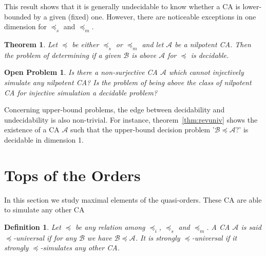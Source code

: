 \documentclass[a4paper]{elsarticle}
\def\qed{\relax\ifmmode\hskip2em \blacksquare\else\unskip\nobreak\hfill\hskip1em $\blacksquare$\fi}
\newcommand{\ACA}{\mathcal{A}}
\newcommand{\ACB}{\mathcal{B}}
\newcommand{\ACC}{\mathcal{C}}
\newcommand\alphabe[1]{S_{#1}}
\newcommand{\alphA}{\alphabe{\ACA}}
\newcommand{\alphB}{\alphabe{\ACB}}
\newcommand{\alphC}{\alphabe{\ACC}}
\newcommand{\fac}{\trianglelefteq}
\newcommand\bulk[2]{{#1}^{\left\langle{#2}\right\rangle}}
\newcommand{\simu}{\preccurlyeq}
\newcommand{\sacsimu}{\simu_i}
\newcommand{\facsimu}{\simu_s}
\newcommand{\facsacsimu}{\simu_m}
\newtheorem{defn}{Definition}[section]
\newtheorem{thm}{Theorem}[section]
\newtheorem{openpb}{Open Problem}
\begin{document}
This result shows that it is generally undecidable to know whether a
CA is lower-bounded by a given (fixed) one. However, there are
noticeable exceptions in one dimension for $\facsimu$ and $\facsacsimu$.

\begin{thm}
  \label{thm:abovenilpo}
  Let $\simu$ be either $\facsimu$ or $\facsacsimu$ and let $\ACA$ be
  a nilpotent CA. Then the problem of determining if a given $\ACB$ is
  above $\ACA$ for $\simu$ is decidable.
\end{thm}

\begin{openpb}
  \label{open:abovenilpo}
  Is there a non-surjective CA $\ACA$ which cannot injectively
  simulate any nilpotent CA? Is the problem of being above the class
  of nilpotent CA for injective simulation a decidable problem?
\end{openpb}


Concerning upper-bound problems, the edge between decidability and
undecidability is also non-trivial.  For instance,
theorem~\ref{thm:revuniv} shows the existence of a CA $\ACA$ such that
the upper-bound decision problem '${\ACB\simu\ACA}$?' is decidable in
dimension 1.


\section{Tops of the Orders}
\label{sec:top}

In this section we study maximal elements of the
quasi-orders. These CA are able to simulate any other CA

\begin{defn}
  Let $\simu$ be any relation among $\sacsimu$, $\facsimu$ and
  $\facsacsimu$. A CA $\ACA$ is said \emph{$\simu$-universal} if for
  any $\ACB$ we have ${\ACB\simu\ACA}$. It is \emph{strongly
    $\simu$-universal} if it strongly $\simu$-simulates any other CA.
\end{defn}
\end{document}
